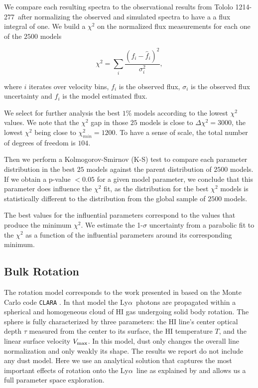 \documentclass[a4,useAMS,usenatbib,usegraphicx]{mn2e}
\newcommand{\tol}{Tololo 1214-277}
\newcommand{\lya}{Ly$\alpha$}
\begin{document}
We compare each resulting spectra to the observational results from
\tol\ after normalizing the observed and simulated spectra to have a a
flux integral of one.
We build a $\chi^2$ on the normalized flux measurements for each one
of the $2500$ models

\begin{equation}
\chi^2 = \sum_{i} \frac{({f}_i - \hat{f}_i)^2}{\sigma_i^2}, 
\label{eq:chi2}
\end{equation}

where $i$ iterates over velocity bins, $f_{i}$ is the observed flux,
$\sigma_i$ is the observed flux uncertainty and $\hat{f}_i$ is the
model estimated flux.
 
We select for further analysis the best $1\%$ models according to the
lowest $\chi^2$ values.
We note that the $\chi^2$ gap in those $25$ models is close to
$\Delta\chi^2 = 3000$, the lowest $\chi^2$ being close to
$\chi^2_{min}=1200$.
To have a sense of scale, the total number of degrees of freedom is
$104$. 

Then we perform a Kolmogorov-Smirnov (K-S) test to compare each parameter
distribution in the best $25$ models against the parent distribution
of $2500$ models. 
If we obtain a p-value $<0.05$ for a given model parameter, we conclude that
this parameter does influence the $\chi^2$ fit, as the distribution for
the best $\chi^2$ models is statistically different to the
distribution from the global sample of $2500$ models.  

The best values for the influential parameters correspond to
the values that produce the minimum
$\chi^2$.
We estimate the 1-$\sigma$ uncertainty from a parabolic fit to the
$\chi^2$ as a function of the influential parameters around its
corresponding minimum.   



\subsection{Bulk Rotation}

The rotation model corresponds to the work presented in
\citep{GaravitoCamargo2014} based on the Monte Carlo code
\texttt{CLARA} \citep{CLARA}. 
In that model the \lya\ photons are propagated 
within a spherical and homogeneous cloud of HI gas undergoing solid
body rotation.
The sphere is fully characterized by three parameters: the HI line's
center optical  depth $\tau$ measured from the center to its surface, the HI
temperature $T$, and the linear surface velocity $V_{\rm max}$.  
In this model, dust only changes the overall line
normalization and only weakly its shape.  
The results we report do not include any dust model.
Here we use an analytical solution that captures the most important
effects of rotation onto the \lya\ line as explained by
\citet{GaravitoCamargo2014} and allows us a full parameter space
exploration.  
\end{document}
